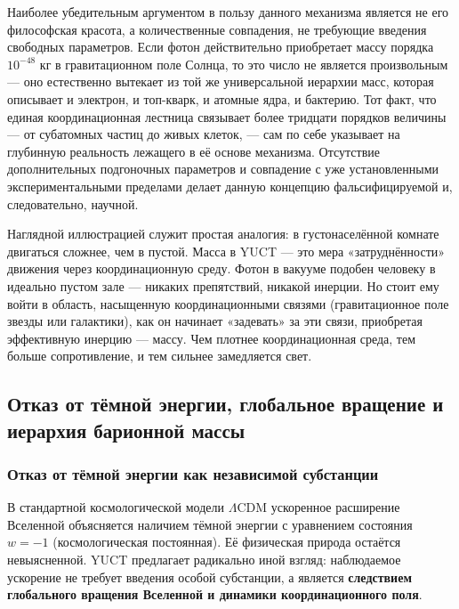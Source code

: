 \documentclass[12pt,a4paper]{article}
\begin{document}
Наиболее убедительным аргументом в пользу данного механизма является не его философская красота, а количественные совпадения, не требующие введения свободных параметров. Если фотон действительно приобретает массу порядка $10^{-48}$ кг в гравитационном поле Солнца, то это число не является произвольным — оно естественно вытекает из той же универсальной иерархии масс, которая описывает и электрон, и топ-кварк, и атомные ядра, и бактерию. Тот факт, что единая координационная лестница связывает более тридцати порядков величины — от субатомных частиц до живых клеток, — сам по себе указывает на глубинную реальность лежащего в её основе механизма. Отсутствие дополнительных подгоночных параметров и совпадение с уже установленными экспериментальными пределами делает данную концепцию фальсифицируемой и, следовательно, научной.

Наглядной иллюстрацией служит простая аналогия: в густонаселённой комнате двигаться сложнее, чем в пустой. Масса в YUCT — это мера «затруднённости» движения через координационную среду. Фотон в вакууме подобен человеку в идеально пустом зале — никаких препятствий, никакой инерции. Но стоит ему войти в область, насыщенную координационными связями (гравитационное поле звезды или галактики), как он начинает «задевать» за эти связи, приобретая эффективную инерцию — массу. Чем плотнее координационная среда, тем больше сопротивление, и тем сильнее замедляется свет.

\subsection{Отказ от тёмной энергии, глобальное вращение и иерархия барионной массы}
\label{subsec:dark_energy_rotation}

\subsubsection{Отказ от тёмной энергии как независимой субстанции}

В стандартной космологической модели $\Lambda$CDM ускоренное расширение Вселенной объясняется наличием тёмной энергии с уравнением состояния $w = -1$ (космологическая постоянная). Её физическая природа остаётся невыясненной. YUCT предлагает радикально иной взгляд: наблюдаемое ускорение не требует введения особой субстанции, а является \textbf{следствием глобального вращения Вселенной и динамики координационного поля}.
\end{document}
